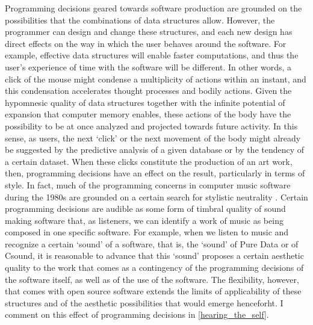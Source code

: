 Programming decisions geared towards software production are grounded on the possibilities that the combinations of data structures allow. However, the programmer can design and change these structures, and each new design has direct effects on the way in which the user behaves around the software. For example, effective data structures will enable faster computations, and thus the user's experience of time with the software will be different. In other words, a click of the mouse might condense a multiplicity of actions within an instant, and this condensation accelerates thought processes and bodily actions. Given the hypomnesic quality of data structures together with the infinite potential of expansion that computer memory enables, these actions of the body have the possibility to be at once analyzed and projected towards future activity. In this sense, as users, the next `click' or the next movement of the body might already be suggested by the predictive analysis of a given database or by the tendency of a certain dataset. When these clicks constitute the production of an art work, then, programming decisions have an effect on the result, particularly in terms of style. In fact, much of the programming concerns in computer music software during the 1980s are grounded on a certain search for stylistic neutrality . Certain programming decisions are audible as some form of timbral quality of sound making software that, as listeners, we can identify a work of music as being composed in one specific software. For example, when we listen to music and recognize a certain `sound' of a software, that is, the `sound' of Pure Data or of Csound, it is reasonable to advance that this `sound' proposes a certain aesthetic quality to the work that comes as a contingency of the programming decisions of the software itself, as well as of the use of the software. The flexibility, however, that comes with open source software extends the limits of applicability of these structures and of the aesthetic possibilities that would emerge henceforht. I comment on this effect of programming decisions in \ref{hearing_the_self}.  

